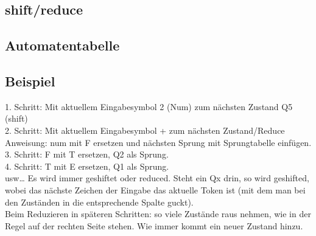 \subsection{shift/reduce}
\subsection{Automatentabelle}
\subsection{Beispiel}
1. Schritt: Mit aktuellem Eingabesymbol 2 (Num) zum nächsten Zustand Q5 (shift)\\
2. Schritt: Mit aktuellem Eingabesymbol + zum nächsten Zustand/Reduce Anweisung: num mit F ersetzen und nächsten Sprung mit Sprungtabelle einfügen.\\
3. Schritt: F mit T ersetzen, Q2 als Sprung.\\
4. Schritt: T mit E ersetzen, Q1 als Sprung.\\
usw… Es wird immer geshiftet oder reduced. Steht ein Qx drin, so wird geshifted, wobei das nächste Zeichen der Eingabe das aktuelle Token ist (mit dem man bei den Zuständen in die entsprechende Spalte guckt).\\
Beim Reduzieren in späteren Schritten: so viele Zustände raus nehmen, wie in der Regel auf der rechten Seite stehen. Wie immer kommt ein neuer Zustand hinzu.




